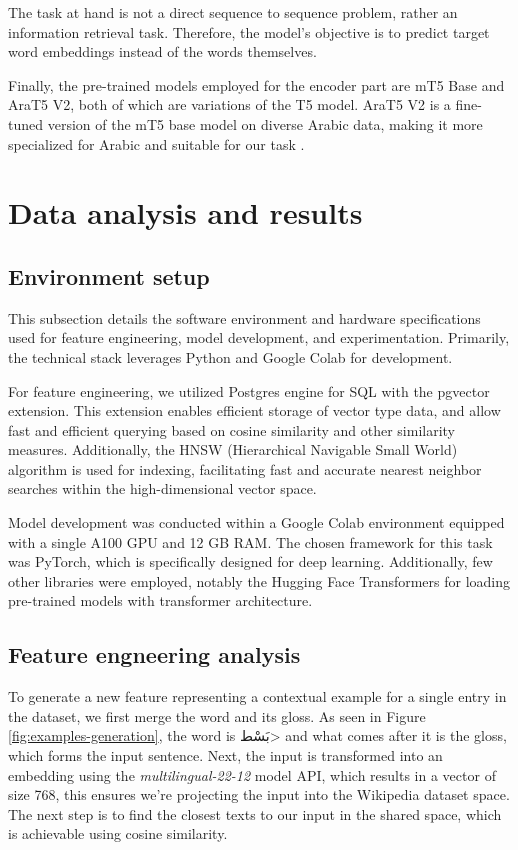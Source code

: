 \documentclass[12.5pt]{article}
\begin{document}
The task at hand is not a direct sequence to sequence problem, rather an information retrieval task. Therefore, the model's objective is to predict target word embeddings instead of the words themselves.

Finally, the pre-trained models employed for the encoder part are mT5 Base and AraT5 V2, both of which are variations of the T5 model. AraT5 V2 is a fine-tuned version of the mT5 base model on diverse Arabic data, making it more specialized for Arabic and suitable for our task \cite{Nagoudi2021}.

\newpage

\section{Data analysis and results}

\subsection{Environment setup}

This subsection details the software environment and hardware specifications used for feature engineering, model development, and experimentation. Primarily, the technical stack leverages Python and Google Colab for development.

For feature engineering, we utilized Postgres engine for SQL with the pgvector extension. This extension enables efficient storage of vector type data, and allow fast and efficient querying based on cosine similarity and other similarity measures. Additionally, the HNSW (Hierarchical Navigable Small World) algorithm is used for indexing, facilitating fast and accurate nearest neighbor searches within the high-dimensional vector space.

Model development was conducted within a Google Colab environment equipped with a single A100 GPU and 12 GB RAM. The chosen framework for this task was PyTorch, which is specifically designed for deep learning. Additionally, few other libraries were employed, notably the Hugging Face Transformers for loading pre-trained models with transformer architecture.

\subsection{Feature engneering analysis}

To generate a new feature representing a contextual example for a single entry in the dataset, we first merge the word and its gloss. As seen in Figure \ref{fig:examples-generation}, the word is \<بَسْط> and what comes after it is the gloss, which forms the input sentence. Next, the input is transformed into an embedding using the \textit{multilingual-22-12} model API, which results in a vector of size 768, this ensures we’re projecting the input into the Wikipedia dataset space. The next step is to find the closest texts to our input in the shared space, which is achievable using cosine similarity.
\end{document}
